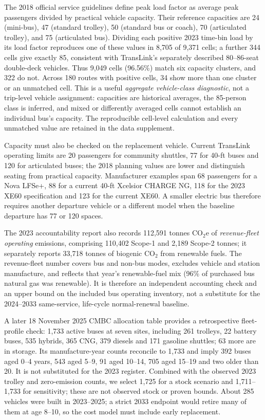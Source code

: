 \documentclass[12pt,letterpaper]{article}
\begin{document}
The 2018 official service guidelines define peak load factor as average peak passengers divided by practical vehicle capacity. Their reference capacities are 24 (mini-bus), 47 (standard trolley), 50 (standard bus or coach), 70 (articulated trolley), and 75 (articulated bus). Dividing each positive 2023 time-bin load by its load factor reproduces one of these values in 8,705 of 9,371 cells; a further 344 cells give exactly 85, consistent with TransLink's separately described 80--86-seat double-deck vehicles. Thus 9,049 cells (96.56\%) match six capacity clusters, and 322 do not. Across 180 routes with positive cells, 34 show more than one cluster or an unmatched cell. This is a useful \emph{aggregate vehicle-class diagnostic}, not a trip-level vehicle assignment: capacities are historical averages, the 85-person class is inferred, and mixed or differently averaged cells cannot establish an individual bus's capacity. The reproducible cell-level calculation and every unmatched value are retained in the data supplement.\cite{guidelines2018,doubledeck2017,loadcsv}

Capacity must also be checked on the replacement vehicle. Current TransLink operating limits are 20 passengers for community shuttles, 77 for 40-ft buses and 120 for articulated buses; the 2018 planning values are lower and distinguish seating from practical capacity.\cite{events2026,guidelines2018} Manufacturer examples span 68 passengers for a Nova LFSe+, 88 for a current 40-ft Xcelsior CHARGE NG, 118 for the 2023 XE60 specification and 123 for the current XE60. A smaller electric bus therefore requires another departure vehicle or a different model when the baseline departure has 77 or 120 spaces.\cite{nova2025,newflyer2025}

The 2023 accountability report also records 112,591 tonnes CO$_2$e of \emph{revenue-fleet operating} emissions, comprising 110,402 Scope-1 and 2,189 Scope-2 tonnes; it separately reports 33,718 tonnes of biogenic CO$_2$ from renewable fuels. The revenue-fleet number covers bus and non-bus modes, excludes vehicle and station manufacture, and reflects that year's renewable-fuel mix (96\% of purchased bus natural gas was renewable). It is therefore an independent accounting check and an upper bound on the included bus operating inventory, not a substitute for the 2024--2033 same-service, life-cycle normal-renewal baseline.\cite{accountability}

A later 18 November 2025 CMBC allocation table provides a retrospective fleet-profile check: 1,733 active buses at seven sites, including 261 trolleys, 22 battery buses, 535 hybrids, 365 CNG, 379 diesels and 171 gasoline shuttles; 63 more are in storage. Its manufacture-year counts reconcile to 1,733 and imply 392 buses aged 0--4 years, 543 aged 5--9, 91 aged 10--14, 705 aged 15--19 and two older than 20. It is not substituted for the 2023 register. Combined with the observed 2023 trolley and zero-emission counts, we select 1,725 for a stock scenario and 1,711--1,733 for sensitivity; these are not observed stock or proven bounds. About 285 vehicles were built in 2023--2025; a strict 2033 endpoint would retire many of them at age 8--10, so the cost model must include early replacement.\cite{cmbcfleet2025,noticeDec}
\end{document}
